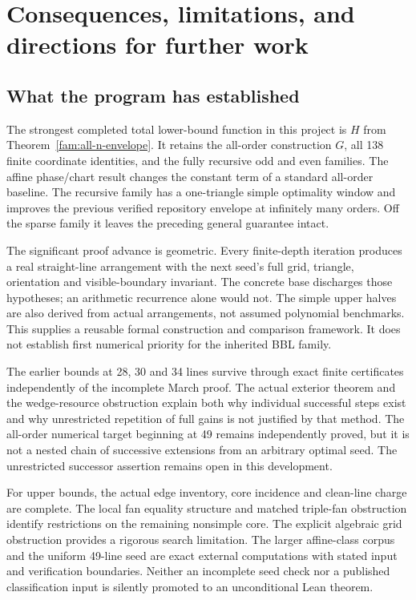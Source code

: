 \section{Consequences, limitations, and directions for further work}\label{sec:discussion}

\subsection{What the program has established}

The strongest completed total lower-bound function in this project is
$H$ from Theorem~\ref{fam:all-n-envelope}. It retains the all-order
construction $G$, all 138 finite coordinate identities, and the fully
recursive odd and even families. The affine phase/chart result changes
the constant term of a standard all-order baseline. The recursive family
has a one-triangle simple optimality window and improves the previous
verified repository envelope at infinitely many orders. Off the sparse
family it leaves the preceding general guarantee intact.

The significant proof advance is geometric. Every finite-depth
iteration produces a real straight-line arrangement with the next
seed's full grid, triangle, orientation and visible-boundary invariant.
The concrete base discharges those hypotheses; an arithmetic recurrence
alone would not. The simple upper halves are also derived from actual
arrangements, not assumed polynomial benchmarks. This supplies a
reusable formal construction and comparison framework. It does not
establish first numerical priority for the inherited BBL family.

The earlier bounds at 28, 30 and 34 lines survive through exact finite
certificates independently of the incomplete March proof. The actual
exterior theorem and the wedge-resource obstruction explain both why
individual successful steps exist and why unrestricted repetition of
full gains is not justified by that method. The all-order numerical
target beginning at 49 remains independently proved, but it is not a
nested chain of successive extensions from an arbitrary optimal seed.
The unrestricted successor assertion remains open in this development.

For upper bounds, the actual edge inventory, core incidence and
clean-line charge are complete. The local fan equality structure and
matched triple-fan obstruction identify restrictions on the remaining
nonsimple core. The explicit algebraic grid obstruction provides a
rigorous search limitation. The larger affine-class corpus and the
uniform 49-line seed are exact external computations with stated input
and verification boundaries. Neither an incomplete seed check nor a
published classification input is silently promoted to an unconditional
Lean theorem.

